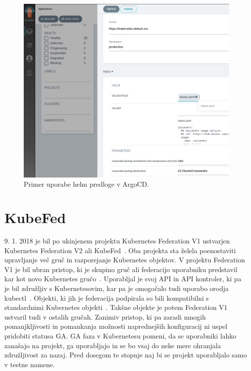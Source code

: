 \documentclass[a4paper, 12pt]{book}
\begin{document}
\begin{figure}[h]
\begin{center}
\includegraphics[width=1.0\textwidth]{images/primer-uporabe-helm-predloge-argo-cd.png}
\end{center}
\caption{Primer uporabe helm predloge v ArgoCD.}
\label{primer-uporabe-helm-predloge-argo-cd}
\end{figure}


\section{KubeFed}
9. 1. 2018 je bil po ukinjenem projektu Kubernetes Federation V1 ustvarjen Kubernetes Federation V2 ali KubeFed~\cite{Kubernetes-federation-evolution}.
Oba projekta sta želela poenostaviti upravljanje več gruč in razporejanje Kubernetes objektov.
V projektu Federation V1 je bil ubran pristop, ki je skupino gruč ali federacijo uporabniku predstavil kar kot novo Kubernetes gručo~\cite{setup-cluster-federation-kubefed-v1}.
Uporabljal je svoj API in API kontroler, ki pa je bil združljiv s Kubernetesovim, kar pa je omogočalo tudi uporabo orodja kubectl~\cite{cluster-federation-in-Kubernetes-1.5}.
Objekti, ki jih je federacija podpirala so bili kompatibilni s standardnimi Kubernetes objekti~\cite{federated-cluster-kubefed-v1}.
Takšne objekte je potem Federation V1 ustvaril tudi v ostalih gručah.
Zanimiv pristop, ki pa zaradi mnogih pomanjkljivosti in pomankanja možnosti naprednejših konfiguracij ni uspel pridobiti statusa GA.
GA faza v Kubernetesu pomeni, da se uporabniki lahko zanašajo na projekt, ga uporabljajo in se bo vsaj do neke mere ohranjala združljivost za nazaj.
Pred dosegom te stopnje naj bi se projekt uporabljalo samo v testne namene.
\end{document}
